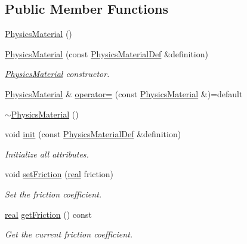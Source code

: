 \subsection*{Public Member Functions}
\begin{DoxyCompactItemize}
\item 
\mbox{\hyperlink{classr3_1_1_physics_material_adf01a85845faf2303264617b4756946b}{Physics\+Material}} ()
\item 
\mbox{\hyperlink{classr3_1_1_physics_material_ae3b11163453e24be78d2c51a638b0708}{Physics\+Material}} (const \mbox{\hyperlink{structr3_1_1_physics_material_def}{Physics\+Material\+Def}} \&definition)
\begin{DoxyCompactList}\small\item\em \mbox{\hyperlink{classr3_1_1_physics_material}{Physics\+Material}} constructor. \end{DoxyCompactList}\item 
\mbox{\hyperlink{classr3_1_1_physics_material}{Physics\+Material}} \& \mbox{\hyperlink{classr3_1_1_physics_material_a2c2b9752b5d5305ca2189e91fb8979e6}{operator=}} (const \mbox{\hyperlink{classr3_1_1_physics_material}{Physics\+Material}} \&)=default
\item 
\mbox{\hyperlink{classr3_1_1_physics_material_a795d62d5fa009bb6aa7d37627ccc4fd0}{$\sim$\+Physics\+Material}} ()
\item 
void \mbox{\hyperlink{classr3_1_1_physics_material_a13509f5494d00fdd5356ca6101c620ac}{init}} (const \mbox{\hyperlink{structr3_1_1_physics_material_def}{Physics\+Material\+Def}} \&definition)
\begin{DoxyCompactList}\small\item\em Initialize all attributes. \end{DoxyCompactList}\item 
void \mbox{\hyperlink{classr3_1_1_physics_material_a8193e719476e1b22ba61b9cd15066437}{set\+Friction}} (\mbox{\hyperlink{namespacer3_ab2016b3e3f743fb735afce242f0dc1eb}{real}} friction)
\begin{DoxyCompactList}\small\item\em Set the friction coefficient. \end{DoxyCompactList}\item 
\mbox{\hyperlink{namespacer3_ab2016b3e3f743fb735afce242f0dc1eb}{real}} \mbox{\hyperlink{classr3_1_1_physics_material_ace861dc19a676ebdb19193076b24a458}{get\+Friction}} () const
\begin{DoxyCompactList}\small\item\em Get the current friction coefficient. \end{DoxyCompactList}\item 

\end{DoxyCompactItemize}
